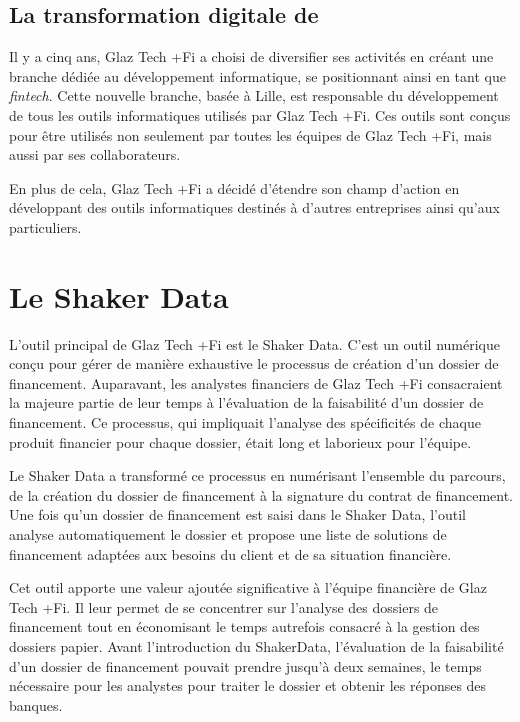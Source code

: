 \documentclass[12pt,oneside,noprintercorrection]{iut}
\begin{document}
\subsection{La transformation digitale de \gz{}}

Il y a cinq ans, Glaz Tech +Fi a choisi de diversifier ses activités en créant une branche dédiée au développement informatique, se positionnant ainsi en tant que \textit{fintech}. Cette nouvelle branche, basée à Lille, est responsable du développement de tous les outils informatiques utilisés par Glaz Tech +Fi. Ces outils sont conçus pour être utilisés non seulement par toutes les équipes de Glaz Tech +Fi, mais aussi par ses collaborateurs.

En plus de cela, Glaz Tech +Fi a décidé d'étendre son champ d'action en développant des outils informatiques destinés à d'autres entreprises ainsi qu'aux particuliers.

\clearpage

\section{Le Shaker Data}
L'outil principal de Glaz Tech +Fi est le Shaker Data. C'est un outil numérique conçu pour gérer de manière exhaustive le processus de création d'un dossier de financement. Auparavant, les analystes financiers de Glaz Tech +Fi consacraient la majeure partie de leur temps à l'évaluation de la faisabilité d'un dossier de financement. Ce processus, qui impliquait l'analyse des spécificités de chaque produit financier pour chaque dossier, était long et laborieux pour l'équipe.

Le Shaker Data a transformé ce processus en numérisant l'ensemble du parcours, de la création du dossier de financement à la signature du contrat de financement. Une fois qu'un dossier de financement est saisi dans le Shaker Data, l'outil analyse automatiquement le dossier et propose une liste de solutions de financement adaptées aux besoins du client et de sa situation financière.

Cet outil apporte une valeur ajoutée significative à l'équipe financière de Glaz Tech +Fi. Il leur permet de se concentrer sur l'analyse des dossiers de financement tout en économisant le temps autrefois consacré à la gestion des dossiers papier. Avant l'introduction du ShakerData, l'évaluation de la faisabilité d'un dossier de financement pouvait prendre jusqu'à deux semaines, le temps nécessaire pour les analystes pour traiter le dossier et obtenir les réponses des banques.
\end{document}
